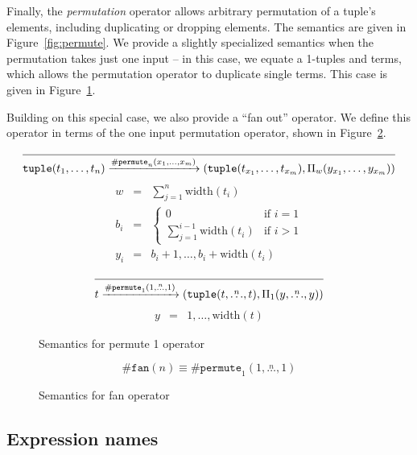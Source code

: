 Finally, the \emph{permutation} operator allows arbitrary permutation of a tuple's elements, including duplicating or dropping elements. The semantics are given in Figure~\ref{fig:permute}. We provide a slightly specialized semantics when the permutation takes just one input -- in this case, we equate a 1-tuples and terms, which allows the permutation operator to duplicate single terms. This case is given in Figure~\ref{fig:permute-one}.

Building on this special case, we also provide a ``fan out'' operator. We define this operator in terms of the one input permutation operator, shown in Figure~\ref{fig:fan}.

\begin{figure*}[htb]
\[
\infer
  {\mathtt{tuple}(t_1,\ldots,t_n) \arr{\mathtt{\#permute}_n(x_1,\ldots,x_m)} (\mathtt{tuple}(t_{x_1},\ldots,t_{x_m}),\Pi_w(y_{x_1},\ldots,y_{x_m}))}
  {}
\]
\begin{eqnarray*}
w   &=& \sum_{j=1}^n \mbox{width}(t_i)\\
b_i &=& \left\{
  \begin{array}{cl}
    0 & \mbox{if } i = 1\\
    \sum_{j=1}^{i-1} \mbox{width}(t_i) & \mbox{if } i > 1
  \end{array}
\right.\\
y_i &=& b_i+1,\ldots,b_i + \mbox{width}(t_i)
\end{eqnarray*}
\caption{Semantics for permutation operator}
\label{fig:permute}
\end{figure*}

\begin{figure}[htb]
\[
\infer
  {t \arr{\mathtt{\#permute}_1(1,\overset{n}{\ldots},1)} (\mathtt{tuple}(t,\overset{n}{\ldots},t),\Pi_1(y,\overset{n}{\ldots},y))}
  {}
\]
\begin{eqnarray*}
y &=& 1,\ldots,\mbox{width}(t)
\end{eqnarray*}
\caption{Semantics for permute 1 operator}
\label{fig:permute-one}
\end{figure}


\begin{figure}[ht]
\[
\mathtt{\#fan}(n) \equiv \mathtt{\#permute}_1(1,\overset{n}{\ldots},1)
\]
\caption{Semantics for fan operator}
\label{fig:fan}
\end{figure}


\subsection{Expression names}
\label{section:names}

